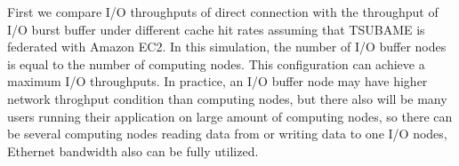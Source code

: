 

First we compare I/O throughputs of direct connection with the throughput of  I/O burst buffer under different cache hit rates assuming that TSUBAME is federated with Amazon EC2.
In this simulation, the number of I/O buffer nodes is equal to the number of computing nodes. This configuration can achieve a maximum I/O throughputs.
In practice, an I/O buffer node may have higher network throghput condition than computing nodes, 
but there also will be many users running their application on large amount of computing nodes, 
so there can be several computing nodes reading data from or writing data to one I/O nodes, 
Ethernet bandwidth also can be fully utilized. 

